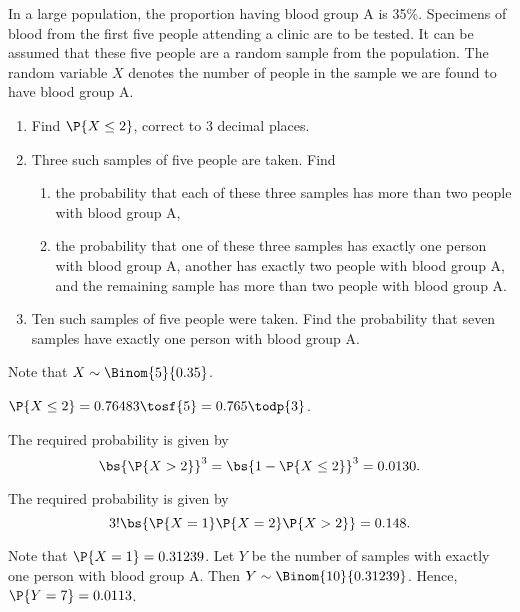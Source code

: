 \begin{problem}
    In a large population, the proportion having blood group A is 35\%. Specimens of blood from the first five people attending a clinic are to be tested. It can be assumed that these five people are a random sample from the population. The random variable $X$ denotes the number of people in the sample we are found to have blood group A.

    \begin{enumerate}
        \item Find $\P{X \leq 2}$, correct to 3 decimal places.
        \item Three such samples of five people are taken. Find
        \begin{enumerate}
            \item the probability that each of these three samples has more than two people with blood group A,
            \item the probability that one of these three samples has exactly one person with blood group A, another has exactly two people with blood group A, and the remaining sample has more than two people with blood group A.
        \end{enumerate}
        \item Ten such samples of five people were taken. Find the probability that seven samples have exactly one person with blood group A.
    \end{enumerate}
\end{problem}
\begin{solution}
    Note that $X \sim \Binom{5}{0.35}$.
    \begin{ppart}
        $\P{X \leq 2} = 0.76483 \tosf{5} = 0.765 \todp{3}$.
    \end{ppart}
    \begin{ppart}
        \begin{psubpart}
            The required probability is given by \[\bs{\P{X > 2}}^3 = \bs{1 - \P{X \leq 2}}^3 = 0.0130.\]
        \end{psubpart}
        \begin{psubpart}
            The required probability is given by \[3! \bs{\P{X = 1} \P{X = 2} \P{X > 2}} = 0.148.\]
        \end{psubpart}
    \end{ppart}
    \begin{ppart}
        Note that $\P{X = 1} = 0.31239$. Let $Y$ be the number of samples with exactly one person with blood group A. Then $Y \sim \Binom{10}{0.31239}$. Hence, $\P{Y = 7} = 0.0113$.
    \end{ppart}
\end{solution}

